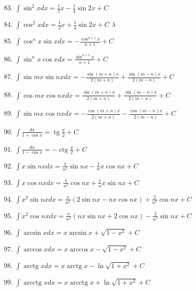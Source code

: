 \documentclass[lang=cn,newtx,12pt,scheme=chinese]{elegantbook}
\begin{document}
83. \(\int {\sin }^{2}{xdx} = \frac{1}{2}x - \frac{1}{4}\sin {2x} + C\)

84. \(\int {\cos }^{2}{xdx} = \frac{1}{2}x + \frac{1}{4}\sin {2x} + C\) \(\lambda\)

85. \(\int {\cos }^{n}x\sin {xdx} = - \frac{{\cos }^{n + 1}x}{n + 1} + C\)

86. \(\int {\sin }^{n}x\cos {xdx} = \frac{{\sin }^{n + 1}x}{n + 1} + C\)

87. \(\int \sin {mx}\sin {nxdx} = - \frac{\sin \left( {m + n}\right) x}{2\left( {m + n}\right) } + \frac{\sin \left( {m - n}\right) x}{2\left( {m - n}\right) } + C\)

88. \(\int \cos {mx}\cos {nxdx} = \frac{\sin \left( {m + n}\right) x}{2\left( {m + n}\right) } + \frac{\sin \left( {m - n}\right) x}{2\left( {m - n}\right) } + C\)

89. \(\int \sin {mx}\cos {nxdx} = - \frac{\cos \left( {m + n}\right) x}{2\left( {m + n}\right) } - \frac{\cos \left( {m - n}\right) x}{2\left( {m - n}\right) } + C\)

90. \(\int \frac{dx}{1 + \cos x} = \operatorname{tg}\frac{x}{2} + C\)

91. \(\int \frac{dx}{1 - \cos x} = - \operatorname{ctg}\frac{x}{2} + C\)

92. \(\int x\sin {nxdx} = \frac{1}{{n}^{2}}\sin {nx} - \frac{1}{n}x\cos {nx} + C\)

93. \(\int x\cos {nxdx} = \frac{1}{{n}^{2}}\cos {nx} + \frac{1}{n}x\sin {nx} + C\)

94. \(\int {x}^{2}\sin {nxdx} = \frac{x}{{n}^{2}}\left( {2\sin {nx} - {nx}\cos {nx}}\right) + \frac{2}{{n}^{3}}\cos {nx} + C\)

95. \(\int {x}^{2}\cos {nxdx} = \frac{x}{{n}^{2}}\left( {{nx}\sin {nx} + 2\cos {nx}}\right) - \frac{2}{{n}^{3}}\sin {nx} + C\)

96. \(\int \arcsin {xdx} = x\arcsin x + \sqrt{1 - {x}^{2}} + C\)

97. \(\int \arccos {xdx} = x\arccos x - \sqrt{1 - {x}^{2}} + C\)

98. \(\int \operatorname{arctg}{xdx} = x\operatorname{arctg}x - \ln \sqrt{1 + {x}^{2}} + C\)

99. \(\int \operatorname{arcctg}{xdx} = x\operatorname{arcctg}x + \ln \sqrt{1 + {x}^{2}} + C\)
\end{document}
